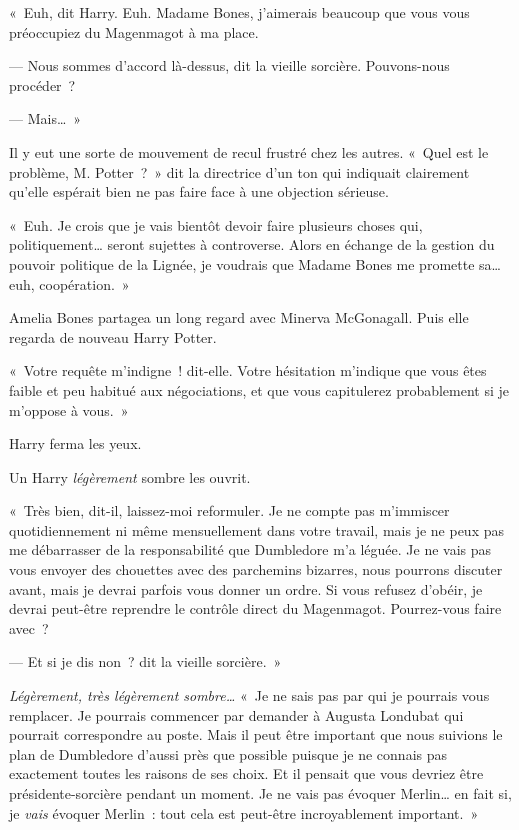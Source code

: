 «~Euh, dit Harry.
Euh. Madame Bones, j'aimerais beaucoup que vous vous préoccupiez du Magenmagot à ma place.

--- Nous sommes d'accord là-dessus, dit la vieille sorcière.
Pouvons-nous procéder~?

--- Mais…~»

Il y eut une sorte de mouvement de recul frustré chez les autres.
«~Quel est le problème, M. Potter~?~»
dit la directrice d'un ton qui indiquait clairement qu'elle espérait bien ne pas faire face à une objection sérieuse.

«~Euh. Je crois que je vais bientôt devoir faire plusieurs choses qui, politiquement… seront sujettes à controverse.
Alors en échange de la gestion du pouvoir politique de la Lignée, je voudrais que Madame Bones me promette sa… euh, coopération.~»

Amelia Bones partagea un long regard avec Minerva McGonagall.
Puis elle regarda de nouveau Harry Potter.

«~Votre requête m'indigne~! dit-elle.
Votre hésitation m'indique que vous êtes faible et peu habitué aux négociations, et que vous capitulerez probablement si je m'oppose à vous.~»

Harry ferma les yeux.

Un Harry \emph{légèrement} sombre les ouvrit.

«~Très bien, dit-il, laissez-moi reformuler.
Je ne compte pas m'immiscer quotidiennement ni même mensuellement dans votre travail, mais je ne peux pas me débarrasser de la responsabilité que Dumbledore m'a léguée.
Je ne vais pas vous envoyer des chouettes avec des parchemins bizarres, nous pourrons discuter avant, mais je devrai parfois vous donner un ordre.
Si vous refusez d'obéir, je devrai peut-être reprendre le contrôle direct du Magenmagot.
Pourrez-vous faire avec~?

--- Et si je dis non~? dit la vieille sorcière.~»

\emph{Légèrement, très légèrement sombre…} «~Je ne sais pas par qui je pourrais vous remplacer.
Je pourrais commencer par demander à Augusta Londubat qui pourrait correspondre au poste.
Mais il peut être important que nous suivions le plan de Dumbledore d'aussi près que possible puisque je ne connais pas exactement toutes les raisons de ses choix.
Et il pensait que vous devriez être présidente-sorcière pendant un moment.
Je ne vais pas évoquer Merlin… en fait si, je \emph{vais} évoquer Merlin~: tout cela est peut-être incroyablement important.~»

